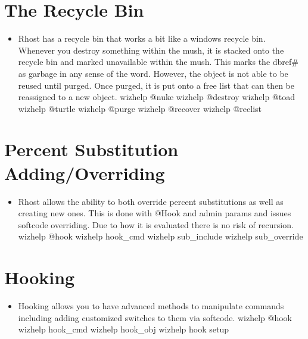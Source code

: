 \documentclass[letterpaper,10pt,english]{sphinxmanual}
\begin{document}
\section{The Recycle Bin}
\label{\detokenize{12-advanced:the-recycle-bin}}\begin{itemize}
\item {} 
\sphinxAtStartPar
Rhost has a recycle bin that works a bit like a windows recycle bin.
Whenever you destroy something within the mush, it is stacked onto
the recycle bin and marked unavailable within the mush.  This marks
the dbref\# as garbage in any sense of the word.  However, the object
is not able to be reused until purged.  Once purged, it is put onto
a free list that can then be reassigned to a new object.
\sphinxhyphen{} wizhelp @nuke
\sphinxhyphen{} wizhelp @destroy
\sphinxhyphen{} wizhelp @toad
\sphinxhyphen{} wizhelp @turtle
\sphinxhyphen{} wizhelp @purge
\sphinxhyphen{} wizhelp @recover
\sphinxhyphen{} wizhelp @reclist

\end{itemize}


\section{Percent Substitution Adding/Overriding}
\label{\detokenize{12-advanced:percent-substitution-adding-overriding}}\begin{itemize}
\item {} 
\sphinxAtStartPar
Rhost allows the ability to both override percent substitutions as
well as creating new ones.  This is done with @Hook and admin
params and issues softcode overriding.  Due to how it is evaluated
there is no risk of recursion.
\sphinxhyphen{} wizhelp @hook
\sphinxhyphen{} wizhelp hook\_cmd
\sphinxhyphen{} wizhelp sub\_include
\sphinxhyphen{} wizhelp sub\_override

\end{itemize}


\section{Hooking}
\label{\detokenize{12-advanced:hooking}}\begin{itemize}
\item {} 
\sphinxAtStartPar
Hooking allows you to have advanced methods to manipulate commands
including adding customized switches to them via softcode.
\sphinxhyphen{} wizhelp @hook
\sphinxhyphen{} wizhelp hook\_cmd
\sphinxhyphen{} wizhelp hook\_obj
\sphinxhyphen{} wizhelp hook setup

\end{itemize}
\end{document}
